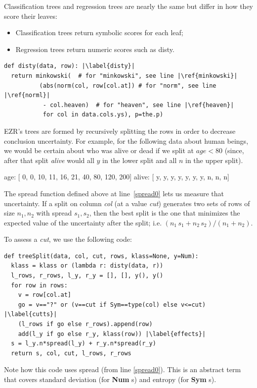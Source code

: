\documentclass[AMA,STIX2COL]{WileyNJDv5}
\newcommand{\cls}[1]{%
  \setlength{\fboxsep}{1.5pt}%
  \colorbox{clsbg}{\sffamily\bfseries{#1}}%
}
\begin{document}
 Classification trees and regression trees are nearly the same
but differ  in how they score  their leaves:
 \begin{itemize}
 \item Classification trees return symbolic   scores
 for each leaf;
 \item Regression trees return numeric scores such as \textsf{disty}.
 \end{itemize}
\begin{verbatim}
def disty(data, row): |\label{disty}| 
  return minkowski(  # for "minkowski", see line |\ref{minkowski}|
          (abs(norm(col, row[col.at]) # for "norm", see line |\ref{norml}|
           - col.heaven)  # for "heaven", see line |\ref{heaven}|
           for col in data.cols.ys), p=the.p)
\end{verbatim}       
EZR's   trees are formed by recursively splitting the rows in order
 to decrease conclusion uncertainty. 
 For example,   for the following data about human beings,
 we would be certain about who was alive or dead if we split
 at   $\mathit{age}<80$
 (since, after that split {\em alive} would all $y$
 in the lower split and all $n$ in the upper split).
 \begin{repl}
 age:   [ 0, 0, 10, 11, 16, 21, 40, 80, 120, 200]
 alive: [ y, y,  y,  y,  y,  y,  y,  n,   n,   n]
\end{repl}
The \textsf{spread} function defined above at line~\ref{spread0} lets us
measure that uncertainty.
If a split on column {\em col} (at a value {\em cut}) generates two sets of rows of
size $n_1,n_2$ with \textsf{spread} $s_1,s_2$, then the best split is
the one that minimizes the expected value of the uncertainty after
the split; i.e. $(n_1\, s_1 + n_2\, s_2)/(n_1 + n_2)$.

To assess a {\em cut},
we use the following code:
\begin{verbatim}
def treeSplit(data, col, cut, rows, klass=None, y=Num):
  klass = klass or (lambda r: disty(data, r))
  l_rows, r_rows, l_y, r_y = [], [], y(), y()
  for row in rows:
    v = row[col.at]
    go = v=="?" or (v==cut if Sym==type(col) else v<=cut) |\label{cutts}|
    (l_rows if go else r_rows).append(row)
    add(l_y if go else r_y, klass(row)) |\label{effects}|
  s = l_y.n*spread(l_y) + r_y.n*spread(r_y)
  return s, col, cut, l_rows, r_rows
\end{verbatim}
Note how this code  uses  \textsf{spread} (from line \ref{spread0}). This is an abstract term
that covers standard deviation (for \cls{Num}s) and entropy (for \cls{Sym}s).
\end{document}
